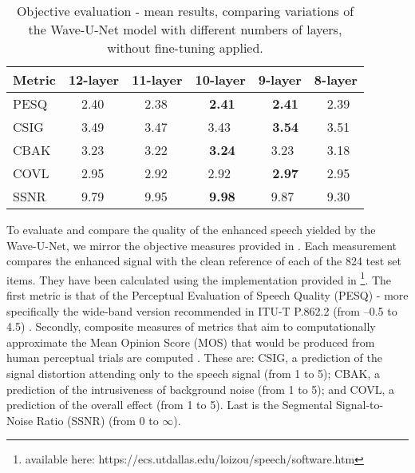\documentclass{article}
\begin{document}
\begin{table}
  \caption{Objective evaluation - mean results, comparing variations of the Wave-U-Net model with different numbers of layers, without fine-tuning applied.}
\label{sample-table}
  \centering
  \begin{tabular}{llllll}
    \toprule
\textbf{Metric}     &\textbf{12-layer}     &\textbf{11-layer}     &\textbf{10-layer}     &\textbf{9-layer}     &\textbf{8-layer} \\
    \midrule


    PESQ & \, \, 2.40 & \, \, 2.38 & \textbf{\, \, 2.41} & \textbf{\, \, 2.41} & \, \, 2.39    \\
    CSIG & \, \, 3.49 & \, \, 3.47 & \, \, 3.43 & \textbf{\, \, 3.54} & \, \, 3.51      \\
    CBAK & \, \, 3.23 & \, \, 3.22 & \textbf{\, \, 3.24} & \, \, 3.23 & \, \, 3.18      \\
    COVL & \, \, 2.95 & \, \, 2.92 & \, \, 2.92 & \textbf{\, \, 2.97} & \, \, 2.95    \\
    SSNR & \, \, 9.79 & \, \, 9.95 & \textbf{\, \, 9.98} & \, \, 9.87 & \, \, 9.30     \\
    
\bottomrule
  \end{tabular}
\end{table}

To evaluate and compare the quality of the enhanced speech yielded by the Wave-U-Net, we mirror the objective measures provided in \citep{Pascual2017}. 
Each measurement compares the enhanced signal with the clean reference of each of the 824 test set items. 
They have been calculated using the implementation provided in \citep{Loizou:2013:SET:2484638}\footnote{available here: https://ecs.utdallas.edu/loizou/speech/software.htm}. The first metric is that of the Perceptual Evaluation of Speech Quality (PESQ) - more specifically the wide-band version recommended in ITU-T P.862.2 (from –0.5 to 4.5) \citep{Loizou:2013:SET:2484638, Pascual2017}. Secondly, composite measures of metrics that aim to computationally approximate the Mean Opinion Score (MOS) that would be produced from human perceptual trials are computed \citep{RethageADenoising}. These are: CSIG, a prediction of the signal
distortion attending only to the speech signal \citep{Hu2008EvaluationEnhancement} (from 1 to 5); CBAK, a prediction of the intrusiveness of background noise \citep{Hu2008EvaluationEnhancement} (from 1 to 5); and COVL, a prediction of the overall effect \citep{Hu2008EvaluationEnhancement} (from 1
to 5). Last is the Segmental Signal-to-Noise Ratio (SSNR) \citep{Quackenbush1988ObjectiveQuality} (from 0 to $\infty$).
\end{document}
